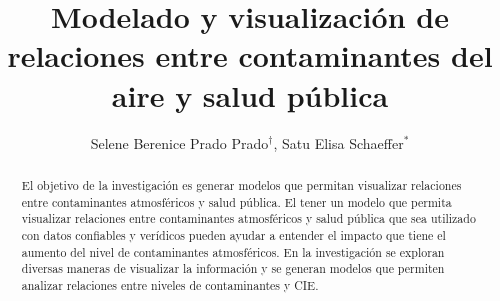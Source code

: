 \documentclass[a0]{sciposter} %
\title{Modelado y visualización de relaciones entre contaminantes del aire y salud pública}
\author{Selene Berenice Prado Prado$^\dagger$, Satu Elisa Schaeffer$^\ast$}
\institute {$^\dagger$ Ingeniería en Tecnología de Software, $^\ast$ Posgrado en Ingeniería de Sistemas}
\begin{document}
\maketitle

\begin{abstract}
El objetivo de la investigación es generar modelos que permitan visualizar relaciones entre contaminantes atmosféricos y salud pública. El tener un modelo que permita visualizar relaciones entre contaminantes atmosféricos y salud pública que sea utilizado con datos confiables y verídicos pueden ayudar a entender el impacto que tiene el aumento del nivel de contaminantes atmosféricos.  En la investigación se exploran diversas maneras de visualizar la información y se generan modelos que permiten analizar relaciones entre niveles de contaminantes y CIE. 
\end{abstract}
\end{document}
